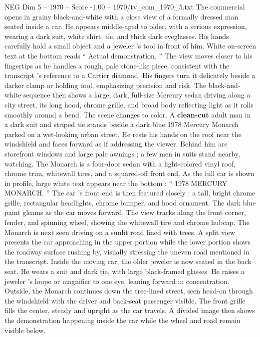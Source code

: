 \begin{textsample}{NEG Dim 5 – 1970 – Score -1.00 – 1970/tv\_com\_1970\_5.txt}  \label{ex:f5_neg_010}
The commercial opens in grainy black-and-white with a close view of a formally dressed man seated inside a car.
He appears middle-aged to older, with a serious expression, wearing a dark suit, white shirt, tie, and thick dark eyeglasses.
His hands carefully hold a small object and a jeweler ’s tool in front of him.
White on-screen text at the bottom reads “ Actual demonstration. ” The view moves closer to his fingertips as he handles a rough, pale stone-like piece, consistent with the transcript ’s reference to a Cartier diamond.
His fingers turn it delicately beside a darker clamp or holding tool, emphasizing precision and risk.
The black-and-white sequence then shows a large, dark, full-size Mercury sedan driving along a city street, its long hood, chrome grille, and broad body reflecting light as it rolls smoothly around a bend.
The scene changes to color.
A \textbf{clean-cut} adult man in a dark suit and striped tie stands beside a dark blue 1978 Mercury Monarch parked on a wet-looking urban street.
He rests his hands on the roof near the windshield and faces forward as if addressing the viewer.
Behind him are storefront windows and large pale awnings ; a few men in suits stand nearby, watching.
The Monarch is a four-door sedan with a light-colored vinyl roof, chrome trim, whitewall tires, and a squared-off front end.
As the full car is shown in profile, large white text appears near the bottom : “ 1978 MERCURY MONARCH. ” The car ’s front end is then featured closely : a tall, bright chrome grille, rectangular headlights, chrome bumper, and hood ornament.
The dark blue paint gleams as the car moves forward.
The view tracks along the front corner, fender, and spinning wheel, showing the whitewall tire and chrome hubcap.
The Monarch is next seen driving on a sunlit road lined with trees.
A split view presents the car approaching in the upper portion while the lower portion shows the roadway surface rushing by, visually stressing the uneven road mentioned in the transcript.
Inside the moving car, the older jeweler is now seated in the back seat.
He wears a suit and dark tie, with large black-framed glasses.
He raises a jeweler ’s loupe or magnifier to one eye, leaning forward in concentration.
Outside, the Monarch continues down the tree-lined street, seen head-on through the windshield with the driver and back-seat passenger visible.
The front grille fills the center, steady and upright as the car travels.
A divided image then shows the demonstration happening inside the car while the wheel and road remain visible below.

\end{textsample}
